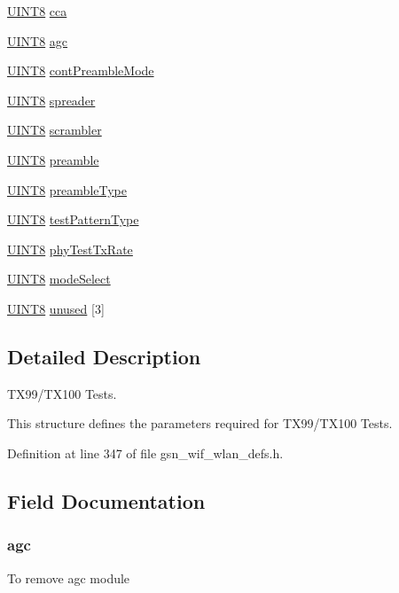 \begin{DoxyCompactItemize}
\hyperlink{a00660_gab27e9918b538ce9d8ca692479b375b6a}{UINT8} \hyperlink{a00190_a23fb83ac7301b94474f56a34bb365b83}{cca}
\item 
\hyperlink{a00660_gab27e9918b538ce9d8ca692479b375b6a}{UINT8} \hyperlink{a00190_a012088b16d12617334694210cd8ddfb8}{agc}
\item 
\hyperlink{a00660_gab27e9918b538ce9d8ca692479b375b6a}{UINT8} \hyperlink{a00190_a0100696bb872bc8447937bc0e7c786bd}{contPreambleMode}
\item 
\hyperlink{a00660_gab27e9918b538ce9d8ca692479b375b6a}{UINT8} \hyperlink{a00190_a143ba26831a37e201c67c2ccb165bf56}{spreader}
\item 
\hyperlink{a00660_gab27e9918b538ce9d8ca692479b375b6a}{UINT8} \hyperlink{a00190_a808943286ddbb9bc1773a11a1f2c7cb3}{scrambler}
\item 
\hyperlink{a00660_gab27e9918b538ce9d8ca692479b375b6a}{UINT8} \hyperlink{a00190_a4e1f59dc2cd10b195a57cab357e42ff6}{preamble}
\item 
\hyperlink{a00660_gab27e9918b538ce9d8ca692479b375b6a}{UINT8} \hyperlink{a00190_a1af7a22bf7a18ef09da23ae8d0e08d22}{preambleType}
\item 
\hyperlink{a00660_gab27e9918b538ce9d8ca692479b375b6a}{UINT8} \hyperlink{a00190_aed5aa730c4619f7bc2b04f439f4701a9}{testPatternType}
\item 
\hyperlink{a00660_gab27e9918b538ce9d8ca692479b375b6a}{UINT8} \hyperlink{a00190_a7251d0e1cb1d341e0ce219c75c5ce68b}{phyTestTxRate}
\item 
\hyperlink{a00660_gab27e9918b538ce9d8ca692479b375b6a}{UINT8} \hyperlink{a00190_a28cb0da8ec076a6515b226010038aa46}{modeSelect}
\item 
\hyperlink{a00660_gab27e9918b538ce9d8ca692479b375b6a}{UINT8} \hyperlink{a00190_ac4a97c2d503f89d8d7c4796e7e3e6c54}{unused} \mbox{[}3\mbox{]}
\end{DoxyCompactItemize}


\subsection{Detailed Description}
TX99/TX100 Tests. 

This structure defines the parameters required for TX99/TX100 Tests. 

Definition at line 347 of file gsn\_\-wif\_\-wlan\_\-defs.h.



\subsection{Field Documentation}
\hypertarget{a00190_a012088b16d12617334694210cd8ddfb8}{
\subsubsection[{agc}]{ {\bf agc}}}
\label{a00190_a012088b16d12617334694210cd8ddfb8}
To remove agc module 

